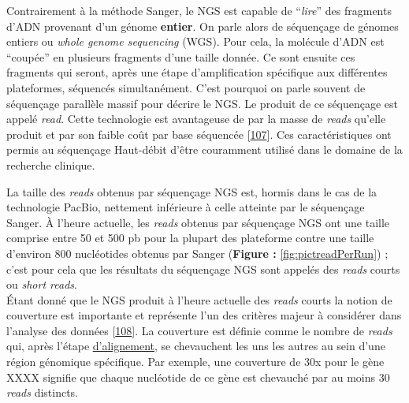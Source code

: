\documentclass[12pt,a4paper,twoside]{ugathesis}
\theoremstyle{definition}
\theoremstyle{definition}
\theoremstyle{definition}
\theoremstyle{remark}
\begin{document}
Contrairement à la méthode Sanger, le NGS est capable de ``\emph{lire}''
des fragments d'ADN provenant d'un génome \textbf{entier}. On parle
alors de séquençage de génomes entiers ou \emph{whole genome sequencing}
(WGS). Pour cela, la molécule d'ADN est ``coupée'' en plusieurs
fragments d'une taille donnée. Ce sont ensuite ces fragments qui seront,
après une étape d'amplification spécifique aux différentes plateformes,
séquencés simultanément. C'est pourquoi on parle souvent de séquençage
parallèle massif pour décrire le NGS. Le produit de ce séquençage est
appelé \emph{read}. Cette technologie est avantageuse de par la masse de
\emph{reads} qu'elle produit et par son faible coût par base séquencée
{[}\protect\hyperlink{ref-Metzker2010}{107}{]}. Ces caractéristiques ont
permis au séquençage Haut-débit d'être couramment utilisé dans le
domaine de la recherche clinique.

La taille des \emph{reads} obtenus par séquençage NGS est, hormis dans
le cas de la technologie PacBio, nettement inférieure à celle atteinte
par le séquençage Sanger. À l'heure actuelle, les \emph{reads} obtenus
par séquençage NGS ont une taille comprise entre 50 et 500 pb pour la
plupart des plateforme contre une taille d'environ 800 nucléotides
obtenus par Sanger (\textbf{Figure :} \ref{fig:pictreadPerRun}) ; c'est
pour cela que les résultats du séquençage NGS sont appelés des
\emph{reads} courts ou \emph{short reads}.\\
Étant donné que le NGS produit à l'heure actuelle des \emph{reads}
courts la notion de couverture est importante et représente l'un des
critères majeur à considérer dans l'analyse des données
{[}\protect\hyperlink{ref-Sims2014}{108}{]}. La couverture est définie
comme le nombre de \emph{reads} qui, après l'étape
\protect\hyperlink{lalignement}{d'alignement}, se chevauchent les uns
les autres au sein d'une région génomique spécifique. Par exemple, une
couverture de 30x pour le gène XXXX signifie que chaque nucléotide de ce
gène est chevauché par au moins 30 \emph{reads} distincts.

\newpage
\end{document}
